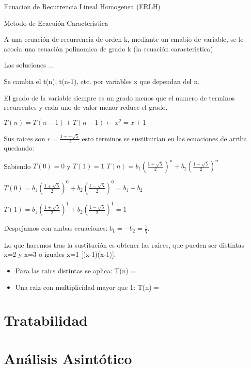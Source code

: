 Ecuacion de Recurrencia Lineal Homogenea (ERLH)

Metodo de Ecacuión Caracteristica

A una ecuación de recurrencia de orden k, mediante un cmabio de variable, se le acocia una ecuación polinomica de grado k (la ecuación caracteristica)

Las soluciones ...

Se cambia el t(n), t(n-1), etc. por variables x que dependan del n.

El grado de la variable siempre es un grado menos que el numero de terminos recurrentes y cada uno de valor menor reduce el grado.

$T(n)=T(n-1)+T(n-1) \leftarrow x^2= x + 1$

Sus raices son $r = \frac{1+- \sqrt{5}}{2}$ esto terminos se sustituirian en las ecuaciones de arriba quedando:

Sabiendo $T(0) = 0$ y $T(1)=1$
$T(n)= b_1(\frac{1+ \sqrt{5}}{2})^n + b_2(\frac{1- \sqrt{5}}{2})^n$

$T(0)= b_1(\frac{1+ \sqrt{5}}{2})^0 + b_2(\frac{1- \sqrt{5}}{2})^0 = b_1 + b_2$

$T(1)= b_1(\frac{1+ \sqrt{5}}{2})^1 + b_2(\frac{1- \sqrt{5}}{2})^1 = 1$

Despejamos con ambas ecuaciones: $b_1 = -b_2 = \frac{1}{5}$.


Lo que hacemos tras la sustitución es obtener las raices, que pueden ser distintas x=2 y x=3 o iguales x=1 [(x-1)(x-1)].
\begin{itemize}
  \item Para las raics distintas se aplica: T(n) =
  \item Una raiz con multiplicidad mayor que 1: T(n) =
\end{itemize}





\section{Tratabilidad}\label{sec:tratabilidad}


\section{Análisis Asintótico}\label{sec:análisis-asintótico}